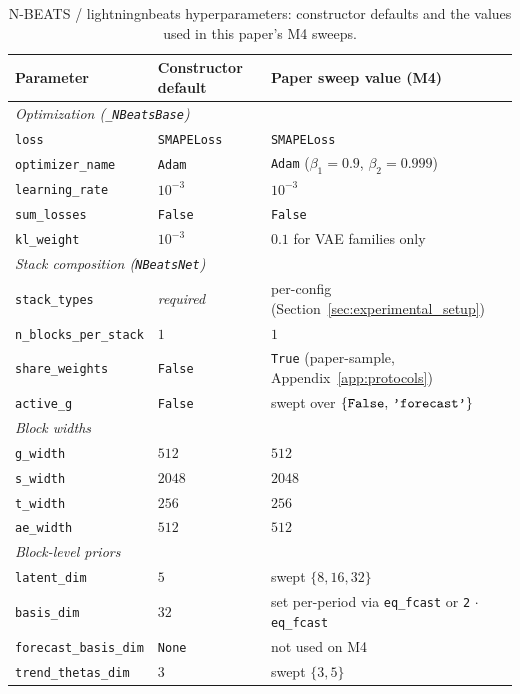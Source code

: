 \documentclass{article}
\begin{document}
\begin{table}[h]
\centering
\small
\caption{N-BEATS / lightningnbeats hyperparameters: constructor defaults and the values used in this paper's M4 sweeps.}
\label{tab:hyperparams_defaults}
\begin{tabular}{@{}lll@{}}
\toprule
Parameter & Constructor default & Paper sweep value (M4) \\
\midrule
\multicolumn{3}{l}{\textit{Optimization (\texttt{\_NBeatsBase})}} \\
\texttt{loss} & \texttt{SMAPELoss} & \texttt{SMAPELoss} \\
\texttt{optimizer\_name} & \texttt{Adam} & \texttt{Adam} ($\beta_1{=}0.9$, $\beta_2{=}0.999$) \\
\texttt{learning\_rate} & $10^{-3}$ & $10^{-3}$ \\
\texttt{sum\_losses} & \texttt{False} & \texttt{False} \\
\texttt{kl\_weight} & $10^{-3}$ & $0.1$ for VAE families only \\
\midrule
\multicolumn{3}{l}{\textit{Stack composition (\texttt{NBeatsNet})}} \\
\texttt{stack\_types} & \emph{required} & per-config (Section~\ref{sec:experimental_setup}) \\
\texttt{n\_blocks\_per\_stack} & $1$ & $1$ \\
\texttt{share\_weights} & \texttt{False} & \texttt{True} (paper-sample, Appendix~\ref{app:protocols}) \\
\texttt{active\_g} & \texttt{False} & swept over $\{\text{\texttt{False}},\,\text{\texttt{'forecast'}}\}$ \\
\midrule
\multicolumn{3}{l}{\textit{Block widths}} \\
\texttt{g\_width} & $512$ & $512$ \\
\texttt{s\_width} & $2048$ & $2048$ \\
\texttt{t\_width} & $256$ & $256$ \\
\texttt{ae\_width} & $512$ & $512$ \\
\midrule
\multicolumn{3}{l}{\textit{Block-level priors}} \\
\texttt{latent\_dim} & $5$ & swept $\{8, 16, 32\}$ \\
\texttt{basis\_dim} & $32$ & set per-period via \texttt{eq\_fcast} or \texttt{2}$\,\cdot\,$\texttt{eq\_fcast} \\
\texttt{forecast\_basis\_dim} & \texttt{None} & not used on M4 \\
\texttt{trend\_thetas\_dim} & $3$ & swept $\{3, 5\}$ \\

\end{tabular}
\end{table}
\end{document}
